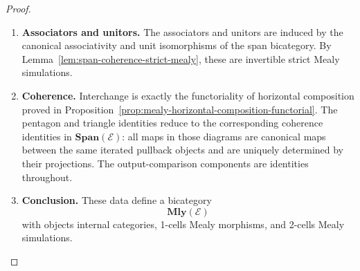 \begin{proof}
\begin{enumerate}
        \item \textbf{Associators and unitors.} The associators and unitors are induced by the canonical associativity and unit isomorphisms of the span bicategory. By Lemma~\ref{lem:span-coherence-strict-mealy}, these are invertible strict Mealy simulations.

        \item \textbf{Coherence.} Interchange is exactly the functoriality of horizontal composition proved in Proposition~\ref{prop:mealy-horizontal-composition-functorial}. The pentagon and triangle identities reduce to the corresponding coherence identities in \(\mathbf{Span}(\mathcal E)\): all maps in those diagrams are canonical maps between the same iterated pullback objects and are uniquely determined by their projections. The output-comparison components are identities throughout.

        \item \textbf{Conclusion.} These data define a bicategory
        \[
            \mathbf{Mly}(\mathcal E)
        \]
        with objects internal categories, 1-cells Mealy morphisms, and 2-cells Mealy simulations.
    \end{enumerate}
\end{proof}

